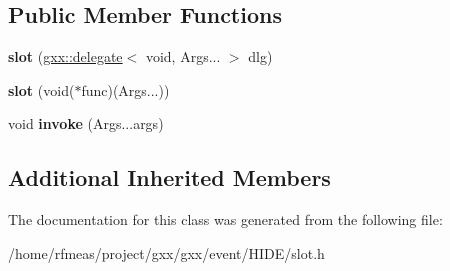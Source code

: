 \subsection*{Public Member Functions}
\begin{DoxyCompactItemize}
\item 
{\bfseries slot} (\hyperlink{classgxx_1_1delegate}{gxx\+::delegate}$<$ void, Args... $>$ dlg)\hypertarget{classgxx_1_1slot_a2b4579c39a135776c073b6cb29a5c7e9}{}\label{classgxx_1_1slot_a2b4579c39a135776c073b6cb29a5c7e9}

\item 
{\bfseries slot} (void($\ast$func)(Args...))\hypertarget{classgxx_1_1slot_a55544740c1e98d19d95ae73dde3af258}{}\label{classgxx_1_1slot_a55544740c1e98d19d95ae73dde3af258}

\item 
void {\bfseries invoke} (Args...\+args)\hypertarget{classgxx_1_1slot_a064411cd1dab2b3d3c92f7287c8c869b}{}\label{classgxx_1_1slot_a064411cd1dab2b3d3c92f7287c8c869b}

\end{DoxyCompactItemize}
\subsection*{Additional Inherited Members}


The documentation for this class was generated from the following file\+:\begin{DoxyCompactItemize}
\item 
/home/rfmeas/project/gxx/gxx/event/\+H\+I\+D\+E/slot.\+h\end{DoxyCompactItemize}
